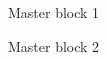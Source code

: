 \documentclass{article}
\begin{document}
\begin{iteblock}
\ite Master block 1
\end{iteblock}



\begin{iteblock}
\ite Master block 2
\end{iteblock}
\end{document}
